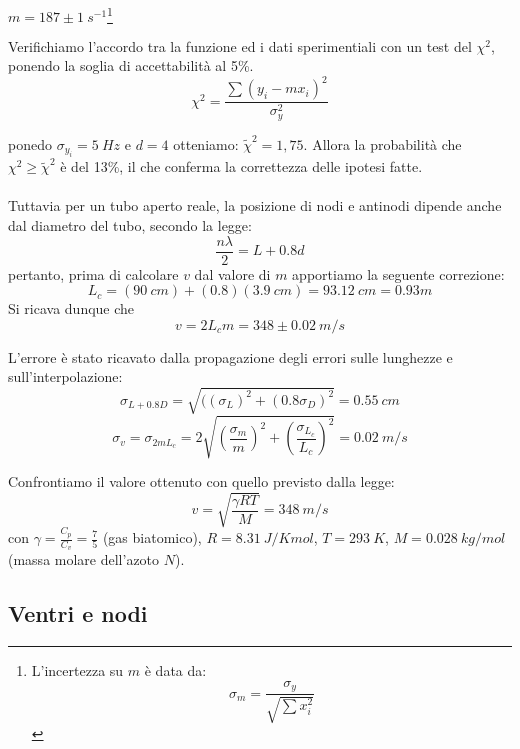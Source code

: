 \begin{center}

$m = 187\pm 1\ s^{-1}$\hspace{1cm}\footnote{L'incertezza su $m$ è data da: $$\sigma_m=\frac{\sigma_y}{\sqrt{\sum{x_i^2}}}$$}
\end{center}

Verifichiamo l'accordo tra la funzione ed i dati sperimentiali con un test del $\chi^2$, ponendo la soglia di accettabilità al 5\%.
\begin{equation}\label{chi2}
\chi^2=\displaystyle{\frac{\sum{(y_i-mx_i)^2}}{\sigma_{y}^2}}
\end{equation}

ponedo $\sigma_{y_i}=5\ Hz$ e $d=4$ otteniamo: $\tilde{\chi}^2=1,75$. Allora la probabilità che $\chi^2\geq\tilde{\chi}^2$ è del 13\%, il che conferma la correttezza delle ipotesi fatte.\\
\\
Tuttavia per un tubo aperto reale, la posizione di nodi e antinodi dipende anche dal diametro del tubo, secondo la legge:
$$\frac{n\lambda}{2}=L+0.8d$$ pertanto, prima di calcolare $v$ dal valore di $m$ apportiamo la seguente correzione:
$$ L_c = (90\ cm)+(0.8)(3.9\ cm) = 93.12\ cm = 0.93 m $$
Si ricava dunque che $$v=2L_cm=348\pm0.02\ m/s$$

L'errore è stato ricavato dalla propagazione degli errori sulle lunghezze e sull'interpolazione:
$$\sigma_{L+0.8D}=\sqrt{((\sigma_L)^2+(0.8\sigma_D)^2}=0.55\ cm$$
$$\sigma_v= \sigma_{2mL_c}= 2\sqrt{\left(\frac{\sigma_m}{m}\right)^2+\left(\frac{\sigma_{L_{c}}}{L_c}\right)^2}= 0.02\ m/s$$



   
Confrontiamo il valore ottenuto con quello previsto dalla legge:
\begin{equation}
v=\sqrt{\frac{\gamma R T}{M}} = 348\ m/s
\end{equation}
con $\gamma=\displaystyle{\frac{C_p}{C_v}}=\frac{7}{5}$ (gas biatomico), $R=8.31\ J/K mol$, $T=293\ K$, $M= 0.028\ kg/mol$ (massa molare dell'azoto $N$).

\subsection{Ventri e nodi}


